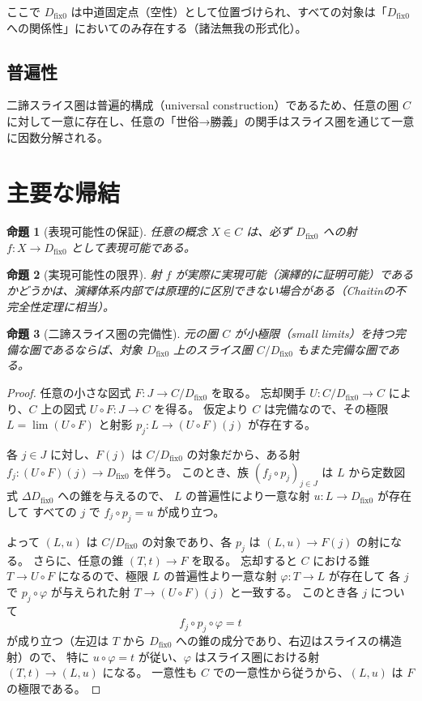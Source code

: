 \documentclass[a4paper,11pt]{article}
\newtheorem{proposition}{命題}
\begin{document}
ここで $D_{\mathrm{fix}0}$ は中道固定点（空性）として位置づけられ、すべての対象は「$D_{\mathrm{fix}0}$ への関係性」においてのみ存在する（諸法無我の形式化）。

\subsection{普遍性}
二諦スライス圏は普遍的構成（universal construction）であるため、任意の圏 $C$ に対して一意に存在し、任意の「世俗→勝義」の関手はスライス圏を通じて一意に因数分解される。

\section{主要な帰結}

\begin{proposition}[表現可能性の保証]
任意の概念 $X \in C$ は、必ず $D_{\mathrm{fix}0}$ への射 $f : X \to D_{\mathrm{fix}0}$ として表現可能である。
\end{proposition}

\begin{proposition}[実現可能性の限界]
射 $f$ が実際に実現可能（演繹的に証明可能）であるかどうかは、演繹体系内部では原理的に区別できない場合がある（Chaitinの不完全性定理に相当）。
\end{proposition}

\begin{proposition}[二諦スライス圏の完備性]\label{prop:two-truths-slice-complete}
元の圏 $C$ が小極限（small limits）を持つ完備な圏であるならば、対象 $D_{\mathrm{fix}0}$ 上のスライス圏 $C/D_{\mathrm{fix}0}$ もまた完備な圏である。
\end{proposition}

\begin{proof}
任意の小さな図式 $F: J \to C/D_{\mathrm{fix}0}$ を取る。
忘却関手 $U: C/D_{\mathrm{fix}0} \to C$ により、$C$ 上の図式 $U\circ F: J \to C$ を得る。
仮定より $C$ は完備なので、その極限 $L=\lim (U\circ F)$ と射影 $p_j: L\to (U\circ F)(j)$ が存在する。

各 $j\in J$ に対し、$F(j)$ は $C/D_{\mathrm{fix}0}$ の対象だから、ある射 $f_j:(U\circ F)(j)\to D_{\mathrm{fix}0}$ を伴う。
このとき、族 $(f_j\circ p_j)_{j\in J}$ は $L$ から定数図式 $\Delta D_{\mathrm{fix}0}$ への錐を与えるので、
$L$ の普遍性により一意な射 $u:L\to D_{\mathrm{fix}0}$ が存在して
すべての $j$ で $f_j\circ p_j = u$ が成り立つ。

よって $(L,u)$ は $C/D_{\mathrm{fix}0}$ の対象であり、各 $p_j$ は $(L,u)\to F(j)$ の射になる。
さらに、任意の錐 $(T,t)\to F$ を取る。
忘却すると $C$ における錐 $T\to U\circ F$ になるので、極限 $L$ の普遍性より一意な射 $\varphi:T\to L$ が存在して
各 $j$ で $p_j\circ \varphi$ が与えられた射 $T\to (U\circ F)(j)$ と一致する。
このとき各 $j$ について
$$
f_j\circ p_j\circ \varphi = t
$$
が成り立つ（左辺は $T$ から $D_{\mathrm{fix}0}$ への錐の成分であり、右辺はスライスの構造射）ので、
特に $u\circ \varphi = t$ が従い、$\varphi$ はスライス圏における射 $(T,t)\to (L,u)$ になる。
一意性も $C$ での一意性から従うから、$(L,u)$ は $F$ の極限である。
\end{proof}
\end{document}
